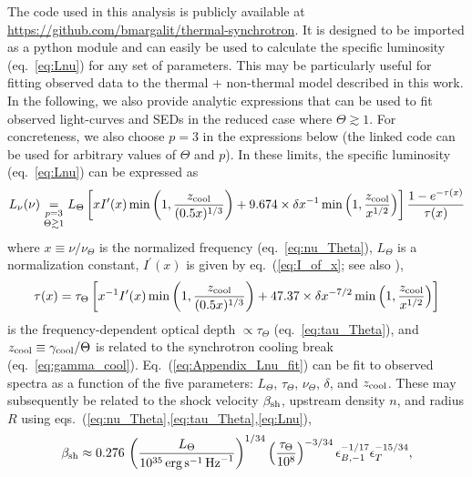 \documentclass[twocolumn]{aastex63}
\begin{document}
The code used in this analysis is publicly available at 
\href{https://github.com/bmargalit/thermal-synchrotron}{https://github.com/bmargalit/thermal-synchrotron}. 
It is designed to be imported as a python module and can easily be used to calculate the specific luminosity (eq.~\ref{eq:Lnu}) for any set of parameters. This may be particularly useful for fitting observed data to the thermal + non-thermal model described in this work.
In the following, we also provide analytic expressions that can be used to fit observed light-curves and SEDs in the reduced case where $\Theta \gtrsim 1$. For concreteness, we also choose $p=3$ in the expressions below (the linked code can be used for arbitrary values of $\Theta$ and $p$). In these limits, the specific luminosity (eq.~\ref{eq:Lnu}) can be expressed as
\begin{equation}
\label{eq:Appendix_Lnu_fit}
    L_\nu(\nu) 
    \underset{\substack{p=3 \\ \Theta \gtrsim 1}}{=}
    L_\Theta
    \left[ x I^\prime(x) \min\left(1, \frac{z_{\rm cool}}{(0.5x)^{1/3}}\right) + 9.674 \times \delta x^{-1} \min\left(1, \frac{z_{\rm cool}}{x^{1/2}}\right)
    \right]
    \frac{1-e^{-\tau(x)}}{\tau(x)}
\end{equation}
where $x \equiv \nu / \nu_\Theta$ is the normalized frequency (eq.~\ref{eq:nu_Theta}), $L_\Theta$ is a normalization constant, $I^\prime(x)$ is given by eq.~(\ref{eq:I_of_x}; see also \citealt{Mahadevan+96}),
\begin{equation}
\label{eq:Appendix_tau}
    \tau(x) = \tau_\Theta 
    \left[
    x^{-1} I^\prime(x) \min\left(1, \frac{z_{\rm cool}}{(0.5x)^{1/3}}\right) + 47.37 \times \delta x^{-7/2} \min\left(1, \frac{z_{\rm cool}}{x^{1/2}}\right)
    \right]
\end{equation}
is the frequency-dependent optical depth $\propto \tau_\Theta$ (eq.~\ref{eq:tau_Theta}), and $z_{\rm cool} \equiv \gamma_{\rm cool}/\Theta$ is related to the synchrotron cooling break (eq.~\ref{eq:gamma_cool}).
Eq.~(\ref{eq:Appendix_Lnu_fit}) can be fit to observed spectra as a function of the five parameters: $L_\Theta$, $\tau_\Theta$, $\nu_\Theta$, $\delta$, and $z_{\rm cool}$. These may subsequently be related to the shock velocity $\beta_{\rm sh}$, upstream density $n$, and radius $R$ using eqs.~(\ref{eq:nu_Theta},\ref{eq:tau_Theta},\ref{eq:Lnu}),
\begin{equation}
    \beta_{\rm sh} \approx 0.276 \, 
    \left(\frac{L_\Theta}{10^{35}\,{\rm erg\,s}^{-1}\,{\rm Hz}^{-1}}\right)^{1/34} \left(\frac{\tau_\Theta}{10^8}\right)^{-3/34} \epsilon_{B,-1}^{-1/17} \epsilon_T^{-15/34}
    ,
\end{equation}
\end{document}
